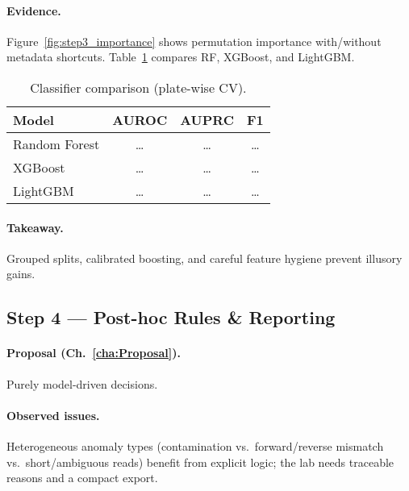\paragraph{Evidence.}
Figure~\ref{fig:step3_importance} shows permutation importance with/without metadata shortcuts. 
Table~\ref{tab:step3_models} compares RF, XGBoost, and LightGBM.


\begin{table}[H]
\centering
\caption{Classifier comparison (plate-wise CV).}
\label{tab:step3_models}
\begin{tabular}{|l|c|c|c|}
\hline
\textbf{Model} & \textbf{AUROC} & \textbf{AUPRC} & \textbf{F1} \\\hline
Random Forest & \dots & \dots & \dots \\\hline
XGBoost       & \dots & \dots & \dots \\\hline
LightGBM      & \dots & \dots & \dots \\\hline
\end{tabular}
\end{table}

\paragraph{Takeaway.} Grouped splits, calibrated boosting, and careful feature hygiene prevent illusory gains.

\subsection*{Step 4 — Post-hoc Rules \& Reporting}
\paragraph{Proposal (Ch.~\ref{cha:Proposal}).}
Purely model-driven decisions.

\paragraph{Observed issues.}
Heterogeneous anomaly types (contamination vs.\ forward/reverse mismatch vs.\ short/ambiguous reads) benefit from explicit logic; the lab needs traceable reasons and a compact export.

